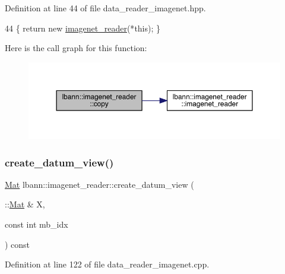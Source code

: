 Definition at line 44 of file data\+\_\+reader\+\_\+imagenet.\+hpp.


\begin{DoxyCode}
44 \{ \textcolor{keywordflow}{return} \textcolor{keyword}{new} \hyperlink{classlbann_1_1imagenet__reader_a642331b94cdc3caad8335d65d096141c}{imagenet\_reader}(*\textcolor{keyword}{this}); \}
\end{DoxyCode}
Here is the call graph for this function\+:\nopagebreak
\begin{figure}[H]
\begin{center}
\leavevmode
\includegraphics[width=350pt]{classlbann_1_1imagenet__reader_a71be5220be24de5caf00d2e422b750f2_cgraph}
\end{center}
\end{figure}
\mbox{\label{classlbann_1_1imagenet__reader_a5c0662ebaa378f7f5b4448f4d207e872}} 
\subsubsection{\texorpdfstring{create\+\_\+datum\+\_\+view()}{create\_datum\_view()}}
{\footnotesize\ttfamily \hyperlink{base_8hpp_a68f11fdc31b62516cb310831bbe54d73}{Mat} lbann\+::imagenet\+\_\+reader\+::create\+\_\+datum\+\_\+view (\begin{DoxyParamCaption}\item[{\+::\hyperlink{base_8hpp_a68f11fdc31b62516cb310831bbe54d73}{Mat} \&}]{X,  }\item[{const int}]{mb\+\_\+idx }\end{DoxyParamCaption}) const\hspace{0.3cm}{\ttfamily [protected]}}



Definition at line 122 of file data\+\_\+reader\+\_\+imagenet.\+cpp.


